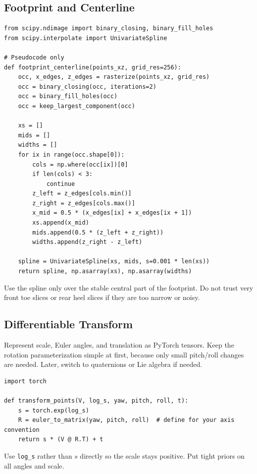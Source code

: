 \documentclass[11pt]{article}
\begin{document}
\subsection{Footprint and Centerline}

\begin{lstlisting}[style=pythonstyle]
from scipy.ndimage import binary_closing, binary_fill_holes
from scipy.interpolate import UnivariateSpline

# Pseudocode only
def footprint_centerline(points_xz, grid_res=256):
    occ, x_edges, z_edges = rasterize(points_xz, grid_res)
    occ = binary_closing(occ, iterations=2)
    occ = binary_fill_holes(occ)
    occ = keep_largest_component(occ)

    xs = []
    mids = []
    widths = []
    for ix in range(occ.shape[0]):
        cols = np.where(occ[ix])[0]
        if len(cols) < 3:
            continue
        z_left = z_edges[cols.min()]
        z_right = z_edges[cols.max()]
        x_mid = 0.5 * (x_edges[ix] + x_edges[ix + 1])
        xs.append(x_mid)
        mids.append(0.5 * (z_left + z_right))
        widths.append(z_right - z_left)

    spline = UnivariateSpline(xs, mids, s=0.001 * len(xs))
    return spline, np.asarray(xs), np.asarray(widths)
\end{lstlisting}

Use the spline only over the stable central part of the footprint. Do not trust very front toe slices or rear heel slices if they are too narrow or noisy.

\subsection{Differentiable Transform}

Represent scale, Euler angles, and translation as PyTorch tensors. Keep the rotation parameterization simple at first, because only small pitch/roll changes are needed. Later, switch to quaternions or Lie algebra if needed.

\begin{lstlisting}[style=pythonstyle]
import torch

def transform_points(V, log_s, yaw, pitch, roll, t):
    s = torch.exp(log_s)
    R = euler_to_matrix(yaw, pitch, roll)  # define for your axis convention
    return s * (V @ R.T) + t
\end{lstlisting}

Use \texttt{log\_s} rather than $s$ directly so the scale stays positive. Put tight priors on all angles and scale.
\end{document}
